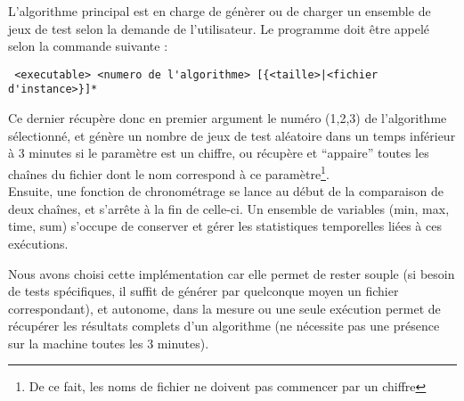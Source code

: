 L'algorithme principal est en charge de génèrer ou de charger un ensemble de jeux de test selon la demande de l'utilisateur. Le programme doit être appelé selon la commande suivante :\\
\begin{verbatim}
 <executable> <numero de l'algorithme> [{<taille>|<fichier d'instance>}]*
\end{verbatim}

Ce dernier récupère donc en premier argument le numéro (1,2,3) de l'algorithme sélectionné, et génère un nombre de jeux de test aléatoire dans un temps inférieur à 3 minutes si le paramètre est un chiffre, ou récupère et ``appaire'' toutes les chaînes du fichier dont le nom correspond à ce paramètre\footnote{De ce fait, les noms de fichier ne doivent pas commencer par un chiffre}.\\
Ensuite, une fonction de chronométrage se lance au début de la comparaison de deux chaînes, et s'arrête à la fin de celle-ci. Un ensemble de variables (min, max, time, sum) s'occupe de conserver et gérer les statistiques temporelles liées à ces exécutions.


Nous avons choisi cette implémentation car elle permet de rester souple (si besoin de tests spécifiques, il suffit de générer par quelconque moyen un fichier correspondant), et autonome, dans la mesure ou une seule exécution permet de récupérer les résultats complets d'un algorithme (ne nécessite pas une présence sur la machine toutes les 3 minutes).
